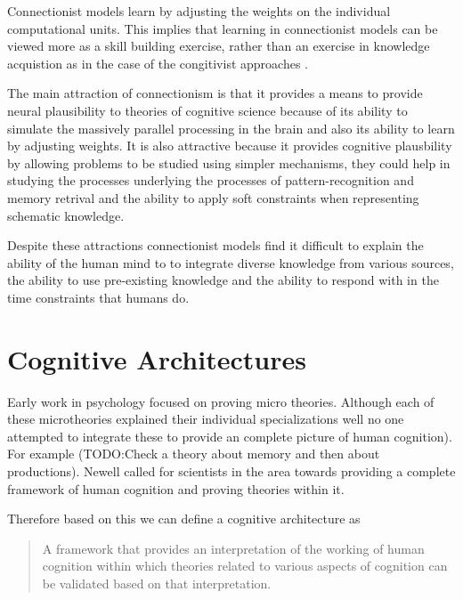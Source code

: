      Connectionist models learn by adjusting the weights on the
     individual computational units. This implies that learning in
     connectionist models can be viewed more as a skill building
     exercise, rather than an exercise in knowledge acquistion as in
     the case of the congitivist approaches
     \cite{DBLP:journals/tec/VernonMS07}.
     
     The main attraction of connectionism is that it provides a means
     to provide neural plausibility\cite{103009} to theories of
     cognitive science because of its ability to simulate the
     massively parallel processing in the brain and also its ability
     to learn by adjusting weights. It is also attractive because it
     provides cognitive plausbility by allowing problems to be studied
     using simpler mechanisms, they could help in studying the
     processes underlying the processes of pattern-recognition and
     memory retrival and the ability to apply soft constraints when
     representing schematic knowledge.

     Despite these attractions connectionist models find it difficult
     to explain the ability of the human mind to to integrate diverse
     knowledge from various sources, the ability to use pre-existing
     knowledge and the ability to respond with in the time constraints
     that humans do.

     
\section{Cognitive Architectures}
Early work in psychology focused on proving micro theories. Although
each of these microtheories explained their individual specializations
well no one attempted to integrate these to provide an complete
picture of human cognition)\cite{citeulike:4408336}. For example
(TODO:Check a theory about memory and then about productions). Newell
called for scientists in the area towards providing a complete
framework of human cognition and proving theories within it.
\cite{Newell:1990aa, citeulike:4408336}

Therefore based on this we can define a cognitive architecture as

\begin{quote}
A framework that provides an interpretation of the working of
human cognition within which theories related to various aspects of
cognition can be validated based on that interpretation.
\end{quote}

